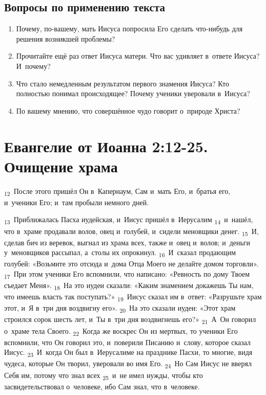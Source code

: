 \documentclass[a4paper,12pt]{article}
\begin{document}
\subsection*{Вопросы по применению текста} 
\begin{enumerate}
    \item Почему, по-вашему, мать Иисуса попросила Его сделать что-нибудь для решения возникшей проблемы? 
    
    \myline
    
    \myline
    \item Прочитайте ещё раз ответ Иисуса матери. Что вас удивляет в~ответе Иисуса? И~почему? 
    
    \myline
    
    \myline
    \item Что стало немедленным результатом первого знамения Иисуса? Кто полностью понимал происходящее? Почему ученики уверовали в~Иисуса? 
    
    \myline
    
    \myline
    \item По вашему мнению, что совершённое чудо говорит о~природе Христа? 

    \myline
    
    \myline
\end{enumerate}



\section{Евангелие от Иоанна 2:12-25. Очищение храма}

\textsubscript{12}~После этого пришёл Он в~Капернаум, Сам и~мать Его, и~братья его, и~ученики Его; и~там пробыли немного дней. 

\textsubscript{13}~Приближалась Пасха иудейская, и~Иисус пришёл в~Иерусалим \textsubscript{14}~и~нашёл, что в~храме продавали волов, овец и~голубей, и~сидели меновщики денег. \textsubscript{15}~И, сделав бич из веревок, выгнал из храма всех, также и~овец и~волов; и~деньги у~меновщиков рассыпал, а~столы их опрокинул. \textsubscript{16}~И~сказал продающим голубей: «Возьмите это отсюда и~дома Отца Моего не делайте домом торговли». \textsubscript{17}~При этом ученики Его вспомнили, что написано: «Ревность по дому Твоем съедает Меня». \textsubscript{18}~На это иудеи сказали: «Каким знамением докажешь Ты нам, что имеешь власть так поступать?» \textsubscript{19}~Иисус сказал им в~ответ: «Разрушьте храм этот, и~Я в~три дня воздвигну его». \textsubscript{20}~На это сказали иудеи: «Этот храм строился сорок шесть лет, и~Ты в~три дня воздвигнешь его?» \textsubscript{21}~А~Он говорил о~храме тела Своего. \textsubscript{22}~Когда же воскрес Он из мертвых, то ученики Его вспомнили, что Он говорил это, и~поверили Писанию и~слову, которое сказал Иисус. \textsubscript{23}~И~когда Он был в~Иерусалиме на празднике Пасхи, то многие, видя чудеса, которые Он творил, уверовали во имя Его. \textsubscript{24}~Но Сам Иисус не вверял Себя им, потому что знал всех \textsubscript{25}~и~не имел нужды, чтобы кто засвидетельствовал о~человеке, ибо Сам знал, что в~человеке.
\end{document}
